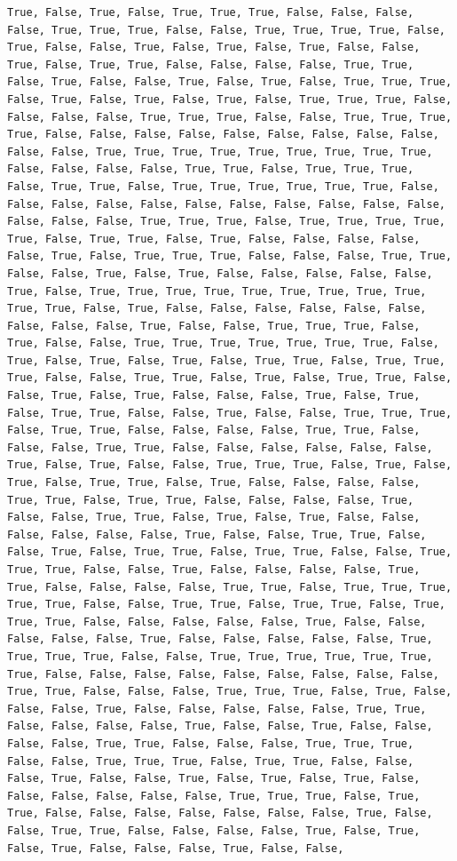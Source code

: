 \documentclass[
  letterpaper,
  DIV=11,
  numbers=noendperiod]{scrartcl}
\begin{document}
\begin{verbatim}
True, False, True, False, True, True, True, False, False, False, False, True, True, True, False, False, True, True, True, True, False, True, False, False, True, False, True, False, True, False, False, True, False, True, True, False, False, False, False, True, True, False, True, False, False, True, False, True, False, True, True, True, False, True, False, True, False, True, False, True, True, True, False, False, False, False, True, True, True, False, False, True, True, True, True, False, False, False, False, False, False, False, False, False, False, False, True, True, True, True, True, True, True, True, True, False, False, False, False, True, True, False, True, True, True, False, True, True, False, True, True, True, True, True, True, False, False, False, False, False, False, False, False, False, False, False, False, False, False, True, True, True, False, True, True, True, True, True, False, True, True, False, True, False, False, False, False, False, True, False, True, True, True, False, False, False, True, True, False, False, True, False, True, False, False, False, False, False, True, False, True, True, True, True, True, True, True, True, True, True, True, False, True, False, False, False, False, False, False, False, False, False, True, False, False, True, True, True, False, True, False, False, True, True, True, True, True, True, True, False, True, False, True, False, True, False, True, True, False, True, True, True, False, False, True, True, False, True, False, True, True, False, False, True, False, True, False, False, False, True, False, True, False, True, True, False, False, True, False, False, True, True, True, False, True, True, False, False, False, False, True, True, False, False, False, True, True, False, False, False, False, False, False, True, False, True, False, False, True, True, True, False, True, False, True, False, True, True, False, True, False, False, False, False, True, True, False, True, True, False, False, False, False, True, False, False, True, True, False, True, False, True, False, False, False, False, False, False, True, False, False, True, True, False, False, True, False, True, True, False, True, True, False, False, True, True, True, False, False, True, False, False, False, False, True, True, False, False, False, False, True, True, False, True, True, True, True, True, False, False, True, True, False, True, True, False, True, True, True, False, False, False, False, False, True, False, False, False, False, False, True, False, False, False, False, False, True, True, True, True, False, False, True, True, True, True, True, True, True, False, False, False, False, False, False, False, False, False, True, True, False, False, False, True, True, True, False, True, False, False, False, True, False, False, False, False, False, True, True, False, False, False, False, True, False, False, True, False, False, False, False, True, True, False, False, False, True, True, True, False, False, True, True, True, False, True, True, False, False, False, True, False, False, True, False, True, False, True, False, False, False, False, False, False, True, True, True, False, True, True, False, False, False, False, False, False, False, True, False, False, True, True, False, False, False, False, True, False, True, False, True, False, False, False, True, False, False, 
\end{verbatim}
\end{document}
